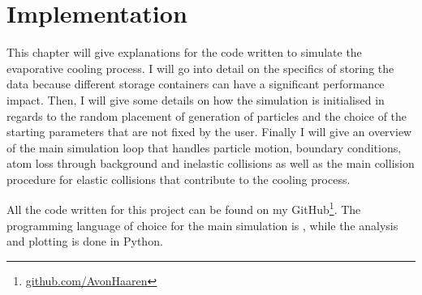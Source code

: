

\chapter{Implementation}
\label{cha:eva_implementation}
This chapter will give explanations for the code written to simulate the evaporative cooling process. I will go into detail on the specifics of storing the data because different storage containers can have a significant performance impact. Then, I will give some details on how the simulation is initialised in regards to the random placement of generation of particles and the choice of the starting parameters that are not fixed by the user. Finally I will give an overview of the main simulation loop that handles particle motion, boundary conditions, atom loss through background and inelastic collisions as well as the main collision procedure for elastic collisions that contribute to the cooling process.

All the code written for this project can be found on my GitHub\footnote{\url{github.com/AvonHaaren}}. The programming language of choice for the main simulation is \Cpp, while the analysis and plotting is done in Python. 
%
